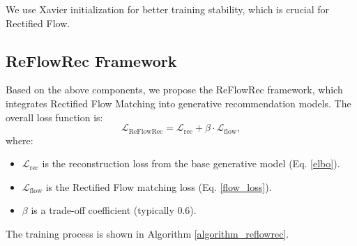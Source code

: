 \documentclass[sigconf]{acmart}
\begin{document}
We use Xavier initialization \cite{glorot2010understanding} for better training stability, which is crucial for Rectified Flow.

\subsection{ReFlowRec Framework}
Based on the above components, we propose the \textsf{ReFlowRec} framework, which integrates Rectified Flow Matching into generative recommendation models. The overall loss function is:
\begin{equation}
\label{reflowrec_loss}
\mathcal L_{\text{ReFlowRec}} = \mathcal L_{\text{rec}} + \beta \cdot \mathcal L_{\text{flow}},
\end{equation}
where:
\begin{itemize}[leftmargin=*]
\item $\mathcal L_{\text{rec}}$ is the reconstruction loss from the base generative model (Eq. \ref{elbo}).
\item $\mathcal L_{\text{flow}}$ is the Rectified Flow matching loss (Eq. \ref{flow_loss}).
\item $\beta$ is a trade-off coefficient (typically 0.6).
\end{itemize}

The training process is shown in Algorithm \ref{algorithm_reflowrec}.
\end{document}
